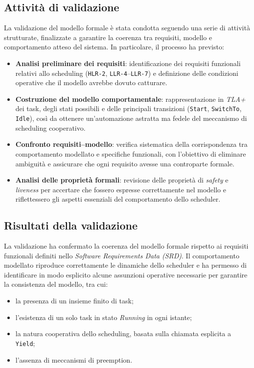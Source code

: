 \documentclass[italian, Lau, oneside]{sapthesis} %
\begin{document}
\subsection{Attività di validazione}

La validazione del modello formale è stata condotta seguendo una serie di attività strutturate, finalizzate a garantire la coerenza tra requisiti, modello e comportamento atteso del sistema. In particolare, il processo ha previsto:

\begin{itemize}
    \item \textbf{Analisi preliminare dei requisiti}: identificazione dei requisiti funzionali relativi allo scheduling (\texttt{HLR-2}, \texttt{LLR-4}–\texttt{LLR-7}) e definizione delle condizioni operative che il modello avrebbe dovuto catturare.
    \item \textbf{Costruzione del modello comportamentale}: rappresentazione in \textit{TLA+} dei task, degli stati possibili e delle principali transizioni (\texttt{Start}, \texttt{SwitchTo}, \texttt{Idle}), così da ottenere un’automazione astratta ma fedele del meccanismo di scheduling cooperativo.
    \item \textbf{Confronto requisiti–modello}: verifica sistematica della corrispondenza tra comportamento modellato e specifiche funzionali, con l’obiettivo di eliminare ambiguità e assicurare che ogni requisito avesse una controparte formale.
    \item \textbf{Analisi delle proprietà formali}: revisione delle proprietà di \textit{safety} e \textit{liveness} per accertare che fossero espresse correttamente nel modello e riflettessero gli aspetti essenziali del comportamento dello scheduler.
\end{itemize}


\subsection{Risultati della validazione}

La validazione ha confermato la coerenza del modello formale rispetto ai requisiti funzionali definiti nello \textit{Software Requirements Data (SRD)}.  
Il comportamento modellato riproduce correttamente le dinamiche dello scheduler e ha permesso di identificare in modo esplicito alcune assunzioni operative necessarie per garantire la consistenza del modello, tra cui:

\begin{itemize}
    \item la presenza di un insieme finito di task;
    \item l’esistenza di un solo task in stato \textit{Running} in ogni istante;
    \item la natura cooperativa dello scheduling, basata sulla chiamata esplicita a \texttt{Yield};
    \item l’assenza di meccanismi di preemption.
\end{itemize}
\end{document}
